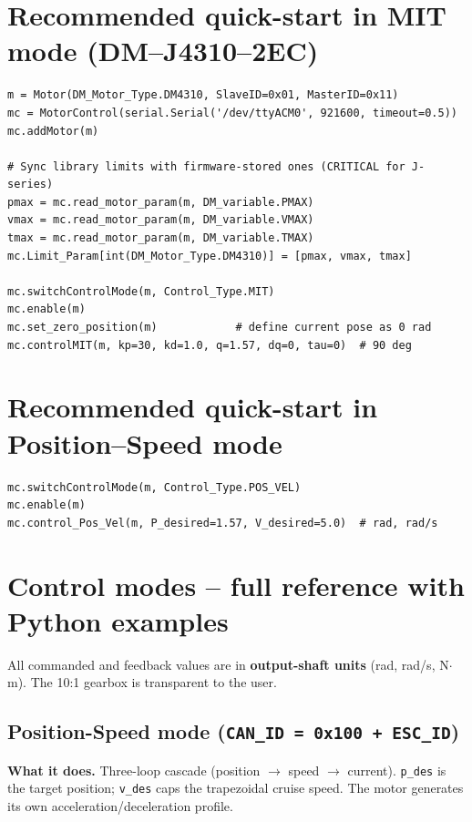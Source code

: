 \documentclass[11pt,a4paper]{article}
\begin{document}
\section{Recommended quick-start in MIT mode (DM--J4310--2EC)}
\begin{lstlisting}
m = Motor(DM_Motor_Type.DM4310, SlaveID=0x01, MasterID=0x11)
mc = MotorControl(serial.Serial('/dev/ttyACM0', 921600, timeout=0.5))
mc.addMotor(m)

# Sync library limits with firmware-stored ones (CRITICAL for J-series)
pmax = mc.read_motor_param(m, DM_variable.PMAX)
vmax = mc.read_motor_param(m, DM_variable.VMAX)
tmax = mc.read_motor_param(m, DM_variable.TMAX)
mc.Limit_Param[int(DM_Motor_Type.DM4310)] = [pmax, vmax, tmax]

mc.switchControlMode(m, Control_Type.MIT)
mc.enable(m)
mc.set_zero_position(m)            # define current pose as 0 rad
mc.controlMIT(m, kp=30, kd=1.0, q=1.57, dq=0, tau=0)  # 90 deg
\end{lstlisting}

\section{Recommended quick-start in Position--Speed mode}
\begin{lstlisting}
mc.switchControlMode(m, Control_Type.POS_VEL)
mc.enable(m)
mc.control_Pos_Vel(m, P_desired=1.57, V_desired=5.0)  # rad, rad/s
\end{lstlisting}

\section{Control modes -- full reference with Python examples}
All commanded and feedback values are in \textbf{output-shaft units}
(rad, rad/s, N$\cdot$m).  The 10:1 gearbox is transparent to the user.

\subsection{Position-Speed mode (\texttt{CAN\_ID = 0x100 + ESC\_ID})}
\textbf{What it does.}
Three-loop cascade (position $\to$ speed $\to$ current).
\texttt{p\_des} is the target position; \texttt{v\_des} caps the trapezoidal
cruise speed.  The motor generates its own acceleration/deceleration profile.
\end{document}
